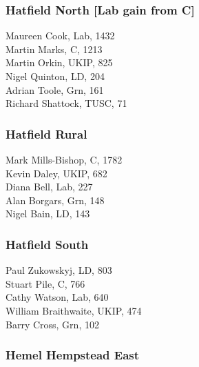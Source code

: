 \documentclass[a4paper,openany,10pt]{book}
\begin{document}
\subsubsection*{Hatfield North \hspace*{\fill}\nolinebreak[1]%
\enspace\hspace*{\fill}
[Lab gain from C]}



Maureen Cook, Lab, 1432\\
Martin Marks, C, 1213\\
Martin Orkin, UKIP, 825\\
Nigel Quinton, LD, 204\\
Adrian Toole, Grn, 161\\
Richard Shattock, TUSC, 71\\


\subsubsection*{Hatfield Rural}



Mark Mills-Bishop, C, 1782\\
Kevin Daley, UKIP, 682\\
Diana Bell, Lab, 227\\
Alan Borgars, Grn, 148\\
Nigel Bain, LD, 143\\


\subsubsection*{Hatfield South}



Paul Zukowskyj, LD, 803\\
Stuart Pile, C, 766\\
Cathy Watson, Lab, 640\\
William Braithwaite, UKIP, 474\\
Barry Cross, Grn, 102\\


\subsubsection*{Hemel Hempstead East}
\end{document}

